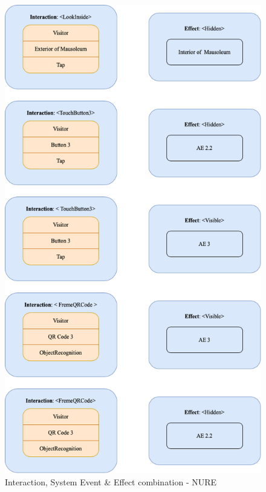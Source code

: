 \begin{figure}[h]
	\centering
	\includegraphics[height=0.95\textheight]{Figures/Conceptual Model/IM_NURE2.png}
	\caption{Interaction, System Event \& Effect combination - NURE}
	\label{fig:IM2NURE}
\end{figure}

